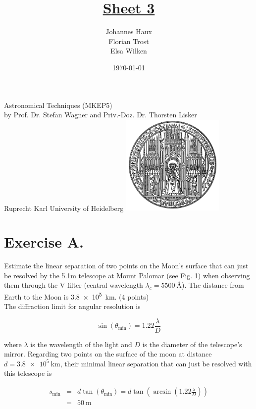 \documentclass[11pt,a4paper,twoside]{article}
\title{\LARGE \underline {Sheet 3}}
\author{Johannes Haux \\ Florian Trost \\ Elsa Wilken}
\date{\today}
\begin{document}
\maketitle
\thispagestyle{empty}

\begin{center}
  Astronomical Techniques (MKEP5) \\
  \baselineskip35pt
  by Prof. Dr. Stefan Wagner and Priv.-Doz. Dr. Thorsten Lisker \\
  \baselineskip60pt
  Ruprecht Karl University of Heidelberg
\vskip 40pt
\includegraphics[width=5cm]{pic/UniHD.png}

\end{center}

\newpage
\setcounter{page}{1}		%

\section*{Exercise A.}

Estimate the linear separation of two points on the Moon's surface that can just be resolved by the 5.1m telescope at Mount Palomar (see Fig. 1) when observing them through the V filter (central wavelength $\lambda_c = \SI{5500}{\angstrom}$). The distance from Earth to the Moon is \SI{3.8e5}{\km}. (4 points) \\

The diffraction limit for angular resolution is 

\begin{equation}
 \sin{\left( \theta_{\text{min}} \right)} = 1.22 \frac{\lambda}{D}
\end{equation}

where $\lambda$ is the wavelength of the light and $D$ is the diameter of the telescope's mirror. Regarding two points on the surface of the moon at distance $d = \SI{3.8e5}{\km}$, their minimal linear separation that can just be resolved with this telescope is 

\begin{eqnarray}
 s_{\text{min}} &=& d \tan{\left( \theta_{\text{min}} \right)} = d \tan{\left( \arcsin{\left( 1.22 \frac{\lambda}{D} \right)} \right)} \\
 &=& \SI{50}{\meter}
\end{eqnarray}
\end{document}
